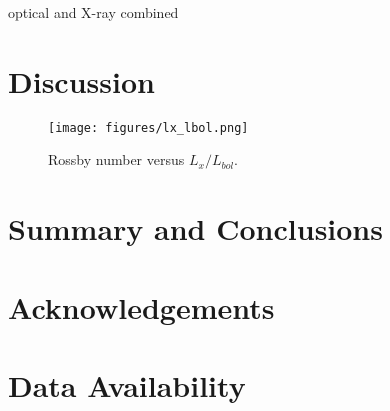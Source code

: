 \documentclass[twocolumn]{aastex631}
\begin{document}
optical and X-ray combined

\section{Discussion}

\begin{figure}[ht!]
    \begin{centering}
        \texttt{[image: figures/lx\_lbol.png]}
        \caption{
         Rossby number versus $L_x/L_{bol}$.
        }
        \label{fig:lxlbol}
    \end{centering}
\end{figure}


\section{Summary and Conclusions}


\section{Acknowledgements}
\citep{lightkurvecollaboration2018lightkurve}

\section{Data Availability}



\end{document}
